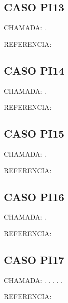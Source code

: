 \documentclass{undftex}
\begin{document}
\begin{refsection}\section*{CASO PI13} CHAMADA: . \textcite{pi13}\par REFERENCIA:\par\printbibliography[heading=none,check=undfconsultadas]\end{refsection}\clearpage
\begin{refsection}\section*{CASO PI14} CHAMADA: . \textcite{pi14}\par REFERENCIA:\par\printbibliography[heading=none,check=undfconsultadas]\end{refsection}\clearpage
\begin{refsection}\section*{CASO PI15} CHAMADA: . \textcite{pi15}\par REFERENCIA:\par\printbibliography[heading=none,check=undfconsultadas]\end{refsection}\clearpage
\begin{refsection}\section*{CASO PI16} CHAMADA: . \textcite{pi16a}\par REFERENCIA:\par\printbibliography[heading=none,check=undfconsultadas]\end{refsection}\clearpage
\begin{refsection}\section*{CASO PI17} CHAMADA: . \textcite{pi17b}. . . . \par REFERENCIA:\par\printbibliography[heading=none,check=undfconsultadas]\end{refsection}\clearpage
\end{document}
